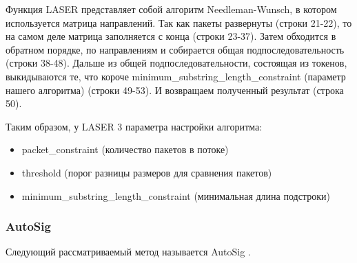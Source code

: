 Функция LASER представляет собой алгоритм Needleman-Wunsch, в котором используется матрица направлений.
Так как пакеты развернуты (строки 21-22), то на самом деле матрица заполняется с конца (строки 23-37).
Затем обходится в обратном порядке, по направлениям и собирается общая подпоследовательность (строки 38-48).
Дальше из общей подпоследовательности, состоящая из токенов, выкидываются те, что короче minimum\_substring\_length\_constraint (параметр нашего алгоритма) (строки 49-53).
И возвращаем полученный результат (строка 50).

Таким образом, у LASER 3 параметра настройки алгоритма:
\begin{itemize}
    \item packet\_constraint (количество пакетов в потоке)
    \item threshold (порог разницы размеров для сравнения пакетов)
    \item minimum\_substring\_length\_constraint (минимальная длина подстроки)
\end{itemize}

\subsubsection{AutoSig}

Следующий рассматриваемый метод называется AutoSig \cite{ye2009autosig, santosautomatic}.

\newpage

